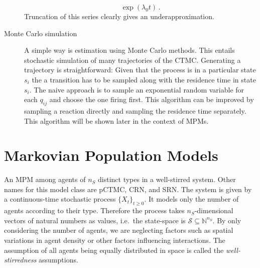 \begin{description}
\[      \exp{(\lambda_0 t)}\,.
    \]
    Truncation of this series clearly gives an underapproximation.
  \item[Monte Carlo simulation]
    A simple way is estimation using Monte Carlo methods. This
    entails stochastic
    simulation of many trajectories of the \ac{CTMC}\@\@. Generating
    a trajectory is
    straightforward: Given that the process is in a particular state $s_i$
    the a transition has to be sampled along with the residence time in state
    $s_i$. The naive approach is to sample an exponential random variable for
    each $q_{ij}$ and choose the one firing first.
    This algorithm can be improved by sampling a reaction directly and
    sampling the residence time separately. This algorithm will be shown later
    in the context of \acp{MPM}\@.
\end{description}

\section{Markovian Population Models}
An \acf{MPM}
among agents of $n_S$ distinct types in a well-stirred system.
Other names for this model class are \acf{pCTMC}, \acf{CRN}, and \acf{SRN}\@.
The system is given by a continuous-time stochastic process $\{X_t\}_{t\geq 0}$.
It models only the number of agents according to their type.
Therefore the process takes $n_S$-dimensional vectors of natural
numbers as values, i.e.\ the
state-space is $\mathcal{S}\subseteq\mathbb{N}^{n_S}$.
By only considering the number of agents, we are neglecting factors
such as spatial variations
in agent density or other factors influencing interactions.
The assumption of all agents being equally distributed in space is
called the \emph{well-stirredness}
assumptions.

